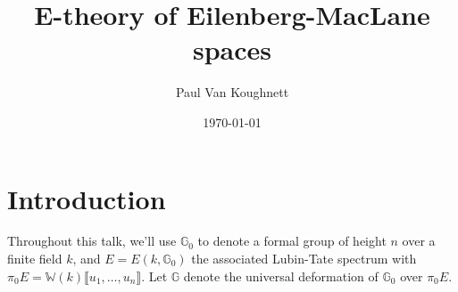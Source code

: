 \documentclass{article}
\title{E-theory of Eilenberg-MacLane spaces}
\author{Paul Van Koughnett}
\date{\today}
\newcommand{\W}{{\mathbb{W}}}
\renewcommand{\G}{{\mathbb{G}}}
\theoremstyle{definition} \newtheorem*{defn}{Definition}
\theoremstyle{plain} \newtheorem*{prop}{Proposition}
\theoremstyle{plain} \newtheorem*{lemma}{Lemma}
\theoremstyle{plain} \newtheorem*{cor}{Corollary}
\theoremstyle{remark} \newtheorem*{ex}{Example}
\theoremstyle{remark} \newtheorem*{exs}{Examples}
\theoremstyle{remark} \newtheorem*{nonex}{Non-example}
\theoremstyle{remark} \newtheorem*{rmk}{Remark}
\theoremstyle{remark} \newtheorem*{exc}{Exercise}
\theoremstyle{remark} \newtheorem*{idea}{Idea}
\theoremstyle{remark} \newtheorem*{obs}{Observation}
\theoremstyle{plain} \newtheorem*{theorem}{Theorem}
\theoremstyle{plain} \newtheorem*{conj}{Conjecture}
\theoremstyle{remark} \newtheorem*{q}{Question}
\theoremstyle{definition} \newtheorem*{fact}{Fact}
\theoremstyle{definition} \newtheorem*{facts}{Facts}
\theoremstyle{remark} \newtheorem*{ntn}{Notation}
\theoremstyle{remark} \newtheorem*{goal}{Goal}
\theoremstyle{remark} \newtheorem*{sketch}{Sketch}
\theoremstyle{definition} \newtheorem{claim}{Claim}
\begin{document}
\maketitle

\setcounter{section}{-1}

\section{Introduction}

Throughout this talk, we'll use $ \G_0 $ to denote a formal group of height $ n $ over a finite field $ k $, and $ E = E(k, \G_0) $ the associated Lubin-Tate spectrum with $ \pi_0 E = \W(k) \llbracket u_1, \ldots, u_{n} \rrbracket $. 
Let $ \G $ denote the universal deformation of $ \G_0 $ over $ \pi_0 E $. 
\end{document}
